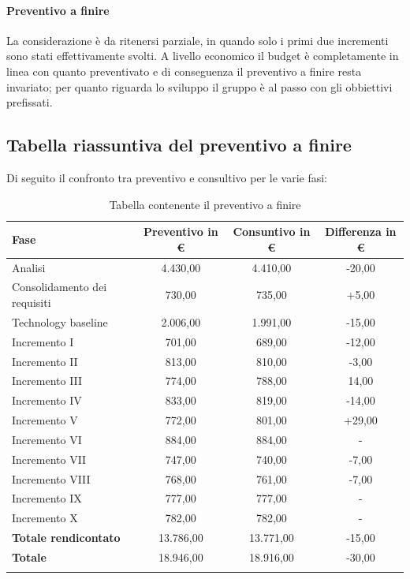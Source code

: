 		\paragraph{Preventivo a finire}
			La considerazione è da ritenersi parziale, in quando solo i primi due incrementi sono stati effettivamente svolti. A livello economico il budget è completamente in linea con quanto preventivato e di conseguenza il preventivo a finire resta invariato; per quanto riguarda lo sviluppo il gruppo è al passo con gli obbiettivi prefissati.
			\pagebreak
	
		
	 	\subsection{Tabella riassuntiva del preventivo a finire}
	 		Di seguito il confronto tra preventivo e consultivo per le varie fasi:
			 \begin{longtable}{|l|c|c|c|}
			 	\hline
			 	\rowcolor{lighter-grayer}
			 	\textbf{Fase} & \textbf{Preventivo in €} & \textbf{Consuntivo in €} & \textbf{Differenza in €}\\
			 	\hline
				\endfirsthead
			 	
			 	\hline
			 	Analisi & 4.430,00 & 4.410,00 & -20,00\\
			 	\hline
			 	\hline
			 	Consolidamento dei requisiti & 730,00 & 735,00 & +5,00\\
			 	\hline
			 	\hline
			 	Technology baseline & 2.006,00 & 1.991,00 & -15,00\\
			 	\hline
			 	\hline
			 	Incremento I & 701,00 & 689,00 & -12,00\\
			 	\hline
			 	\hline
			 	Incremento II & 813,00 & 810,00 & -3,00\\
			 	\hline
			 	\hline
			 	Incremento III & 774,00 & 788,00 & 14,00\\
			 	\hline
			 	\hline
			 	Incremento IV & 833,00 & 819,00 & -14,00\\
			 	\hline
			 	\hline
			 	Incremento V & 772,00 & 801,00 & +29,00\\
			 	\hline
			 	\hline
			 	Incremento VI & 884,00 & 884,00 & -\\
			 	\hline
			 	\hline
			 	Incremento VII & 747,00 & 740,00 & -7,00\\
			 	\hline
			 	\hline
			 	Incremento VIII & 768,00 & 761,00 & -7,00\\
			 	\hline
			 	\hline
			 	Incremento IX & 777,00 & 777,00 & -\\
			 	\hline
			 	\hline
			 	Incremento X & 782,00 & 782,00 & -\\
			 	\hline
			 	\textbf{Totale rendicontato} & 13.786,00 & 13.771,00 & -15,00\\
			 	\hline
			 	\hline
			 	\textbf{Totale} & 18.946,00 & 18.916,00 & -30,00\\
			 	\hline
			 	\caption{Tabella contenente il preventivo a finire}
			 \end{longtable}
